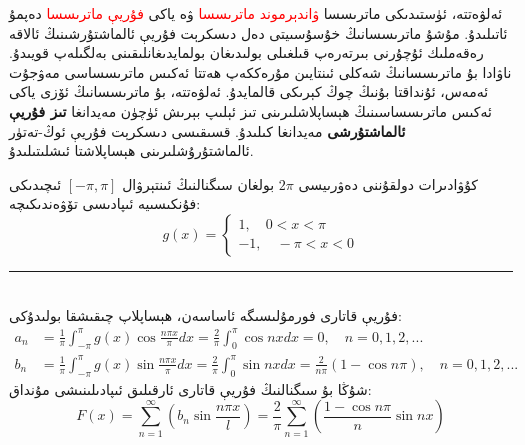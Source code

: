 ئەلۋەتتە، ئۈستىدىكى ماترىسسا 
\textcolor{red}{ۋاندېرموند ماترىسسا}
ۋە ياكى 
\textcolor{red}{ فۇريې ماترىسسا}
دەپمۇ ئاتىلىدۇ. مۇشۇ ماترىسسانىڭ خۇسۇسىيتى دەل دىسكرېت فۇريې ئالماشتۇرشىنىڭ ئالاقە رەقەملىك ئۇچۇرنى بىرتەرەپ قىلغىلى بولىدىغان بولمايدىغانلىقىنى بەلگىلەپ قويىدۇ. ناۋادا بۇ ماترىسسانىڭ شەكلى ئىنتايىن مۇرەككەپ ھەتتا ئەكىس ماترىسساسى مەۋجۇت ئەمەس، ئۇنداقتا بۇنىڭ چوڭ كېرىكى قالمايدۇ. ئەلۋەتتە، بۇ ماترىسسانىڭ ئۆزى ياكى ئەكىس ماترىسساسىنىڭ ھېساپلاشلىرىنى تىز ئېلىپ بېرىش ئۈچۈن مەيدانغا 
  \textbf{تىز فۇريې ئالماشتۇرشى}
   مەيدانغا كىلىدۇ. قسىقىسى دىسكرېت فۇريې ئوڭ-تەتۈر ئالماشتۇرۇشلىرىنى ھېساپلاشتا ئىشلىتىلىدۇ.

\begin{myexample}
	كۇۋادىرات دولقۇننى دەۋرىيسى $2\pi$ بولغان سىگنالنىڭ ئىنتېرۋال $[-\pi,\pi]$ ئىچىدىكى فۇنكىسىيە ئىپادىسى تۆۋەندىكىچە:
	$$g(x) = 
	\begin{cases}
		1 ,\quad 0 < x < \pi \\
		-1 , \quad -\pi < x < 0
	\end{cases}
	$$
	\rule{\linewidth}{0.05em}\\
	فۇريې قاتارى فورمۇلىسىگە ئاساسەن، ھېساپلاپ چىقىشقا بولىدۇكى:
\begin{align*}
a_n &= \frac{1}{\pi} \int_{-\pi}^{\pi}g(x) \cos \frac{n \pi x}{\pi} dx 
= \frac{2}{\pi} \int_{0}^{\pi}\cos nxdx = 0, \quad n=0,1,2,...\\
b_n &= \frac{1}{\pi} \int_{-\pi}^{\pi}g(x) \sin \frac{n \pi x}{\pi} dx
= \frac{2}{\pi} \int_{0}^{\pi}\sin nxdx = \frac{2}{n\pi}(1-\cos n\pi), \quad n=0,1,2,...
\end{align*}
شۇڭا بۇ سىگنالنىڭ فۇريې قاتارى ئارقىلىق ئىپادىلىنىشى مۇنداق:
$$
F(x)=\sum_{n=1}^{\infty}(b_n\sin \frac{n \pi x}{l}) = \frac{2}{\pi} \sum_{n=1}^{\infty}(\frac{1-\cos n\pi}{n} \sin nx)
$$
\end{myexample}

